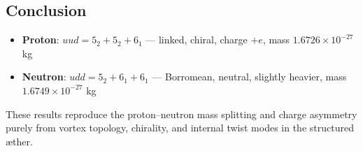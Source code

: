 \subsection{Conclusion}

\begin{itemize}
    \item \textbf{Proton}: \( uud = 5_2 + 5_2 + 6_1 \) — linked, chiral, charge \(+e\), mass \(1.6726 \times 10^{-27}\) kg
    \item \textbf{Neutron}: \( udd = 5_2 + 6_1 + 6_1 \) — Borromean, neutral, slightly heavier, mass \(1.6749 \times 10^{-27}\) kg
\end{itemize}

These results reproduce the proton–neutron mass splitting and charge asymmetry purely from vortex topology, chirality, and internal twist modes in the structured \ae ther.
